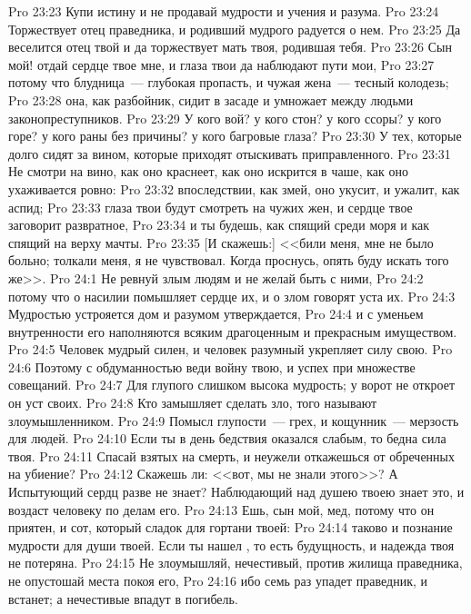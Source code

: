 \vs Pro 23:23 Купи истину и не продавай мудрости и учения и разума.
\vs Pro 23:24 Торжествует отец праведника, и родивший мудрого радуется о нем.
\vs Pro 23:25 Да веселится отец твой и да торжествует мать твоя, родившая тебя.
\rsbpar\vs Pro 23:26 Сын мой! отдай сердце твое мне, и глаза твои да наблюдают пути мои,
\vs Pro 23:27 потому что блудница~--- глубокая пропасть, и чужая жена~--- тесный колодезь;
\vs Pro 23:28 она, как разбойник, сидит в засаде и умножает между людьми законопреступников.
\vs Pro 23:29 У кого вой? у кого стон? у кого ссоры? у кого горе? у кого раны без причины? у кого багровые глаза?
\vs Pro 23:30 У тех, которые долго сидят за вином, которые приходят отыскивать  приправленного.
\vs Pro 23:31 Не смотри на вино, как оно краснеет, как оно искрится в чаше, как оно ухаживается ровно:
\vs Pro 23:32 впоследствии, как змей, оно укусит, и ужалит, как аспид;
\vs Pro 23:33 глаза твои будут смотреть на чужих жен, и сердце твое заговорит развратное,
\vs Pro 23:34 и ты будешь, как спящий среди моря и как спящий на верху мачты.
\vs Pro 23:35 [И скажешь:] <<били меня, мне не было больно; толкали меня, я не чувствовал. Когда проснусь, опять буду искать того же>>.
\vs Pro 24:1 Не ревнуй злым людям и не желай быть с ними,
\vs Pro 24:2 потому что о насилии помышляет сердце их, и о злом говорят уста их.
\vs Pro 24:3 Мудростью устрояется дом и разумом утверждается,
\vs Pro 24:4 и с уменьем внутренности его наполняются всяким драгоценным и прекрасным имуществом.
\vs Pro 24:5 Человек мудрый силен, и человек разумный укрепляет силу свою.
\vs Pro 24:6 Поэтому с обдуманностью веди войну твою, и успех  при множестве совещаний.
\vs Pro 24:7 Для глупого слишком высока мудрость; у ворот не откроет он уст своих.
\vs Pro 24:8 Кто замышляет сделать зло, того называют злоумышленником.
\vs Pro 24:9 Помысл глупости~--- грех, и кощунник~--- мерзость для людей.
\vs Pro 24:10 Если ты в день бедствия оказался слабым, то бедна сила твоя.
\vs Pro 24:11 Спасай взятых на смерть, и неужели откажешься от обреченных на убиение?
\vs Pro 24:12 Скажешь ли: <<вот, мы не знали этого>>? А Испытующий сердц разве не знает? Наблюдающий над душею твоею знает это, и воздаст человеку по делам его.
\vs Pro 24:13 Ешь, сын мой, мед, потому что он приятен, и сот, который сладок для гортани твоей:
\vs Pro 24:14 таково и познание мудрости для души твоей. Если ты нашел , то есть будущность, и надежда твоя не потеряна.
\vs Pro 24:15 Не злоумышляй, нечестивый, против жилища праведника, не опустошай места покоя его,
\vs Pro 24:16 ибо семь раз упадет праведник, и встанет; а нечестивые впадут в погибель.
